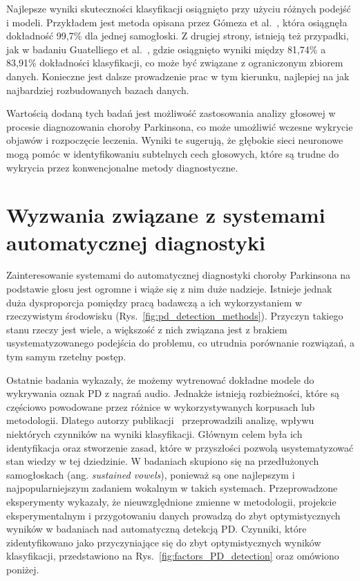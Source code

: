 Najlepsze wyniki skuteczności klasyfikacji osiągnięto przy użyciu różnych podejść i modeli.
Przykładem jest metoda opisana przez Gómeza et al.~\cite{8999815}, która osiągnęła dokładność 99,7\% dla jednej samogłoski.
Z drugiej strony, istnieją też przypadki, jak w badaniu Guatelliego et al.~\cite{GUATELLI2023106700}, gdzie osiągnięto wyniki między
81,74\% a 83,91\% dokładności klasyfikacji, co może być związane z ograniczonym zbiorem danych.
Konieczne jest dalsze prowadzenie prac w tym kierunku, najlepiej na jak najbardziej rozbudowanych bazach danych.

Wartością dodaną tych badań jest możliwość zastosowania analizy głosowej w procesie diagnozowania choroby Parkinsona, co może umożliwić
wczesne wykrycie objawów i rozpoczęcie leczenia.
Wyniki te sugerują, że głębokie sieci neuronowe mogą pomóc w identyfikowaniu subtelnych cech
głosowych, które są trudne do wykrycia przez konwencjonalne metody diagnostyczne.

\section{Wyzwania związane z systemami automatycznej diagnostyki}\label{sec:wyzwania}

Zainteresowanie systemami do automatycznej diagnostyki choroby Parkinsona na podstawie głosu jest ogromne i wiąże się z nim duże nadzieje.
Istnieje jednak duża dysproporcja pomiędzy pracą badawczą a ich wykorzystaniem w rzeczywistym środowisku (Rys.~\ref{fig:pd_detection_methods}).
Przyczyn takiego stanu rzeczy jest wiele, a większość z nich związana jest z brakiem usystematyzowanego podejścia do problemu, co utrudnia porównanie
rozwiązań, a tym samym rzetelny postęp.

Ostatnie badania wykazały, że możemy wytrenować dokładne modele do wykrywania oznak PD z nagrań audio.
Jednakże istnieją rozbieżności, które są częściowo powodowane przez różnice w
wykorzystywanych korpusach lub metodologii.
Dlatego autorzy publikacji~\cite{SustainedVowelsProblems} przeprowadzili analizę, wpływu niektórych czynników na wyniki klasyfikacji.
Głównym celem była ich identyfikacja oraz stworzenie zasad, które w przyszłości pozwolą usystematyzować stan wiedzy w tej dziedzinie.
W badaniach skupiono się na przedłużonych samogłoskach (ang. \emph{sustained vowels}), ponieważ są one najlepszym i najpopularniejszym zadaniem
wokalnym w takich systemach.
Przeprowadzone eksperymenty wykazały, że nieuwzględnione zmienne w metodologii, projekcie eksperymentalnym i
przygotowaniu danych prowadzą do zbyt optymistycznych wyników w badaniach nad automatyczną detekcją PD\@.
Czynniki, które zidentyfikowano jako przyczyniające się do zbyt optymistycznych wyników klasyfikacji, przedstawiono na Rys.~\ref{fig:factors_PD_detection} oraz omówiono poniżej.


